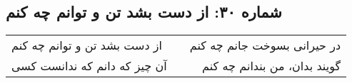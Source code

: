 \begin{center}
\section*{شماره ۳۰: از دست بشد تن و توانم چه کنم}
\label{sec:030}
\begin{longtable}{l p{0.5cm} r}
از دست بشد تن و توانم چه کنم
&&
در حیرانی بسوخت جانم چه کنم
\\
آن چیز که دانم که ندانست کسی
&&
گویند بدان، من بندانم چه کنم
\\
\end{longtable}
\end{center}
